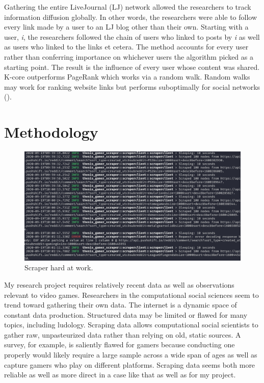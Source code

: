 \documentclass[12pt, a4paper]{article}
\begin{document}
Gathering the entire LiveJournal (LJ) network allowed the researchers to track information diffusion globally. In other words, the researchers were able to follow every link made by a user to an LJ blog other than their own. Starting with a user, \textit{i}, the researchers followed the chain of users who linked to posts by \textit{i} as well as users who linked to the links et cetera. The method accounts for every user rather than conferring importance on whichever users the algorithm picked as a starting point. The result is the influence of every user whose content was shared. K-core outperforms PageRank which works via a random walk. Random walks may work for ranking website links but performs suboptimally for social networks (\cite{peispread2014}).

\section{Methodology}

\begin{figure}[ht!]
  \includegraphics[width=\linewidth]{scraper_at_work.png}
  \caption{Scraper hard at work.}
  \label{fig:workingscraper}
\end{figure}

My research project requires relatively recent data as well as observations relevant to video games. Researchers in the computational social sciences seem to trend toward gathering their own data. The internet is a dynamic space of constant data production. Structured data may be limited or flawed for many topics, including ludology. Scraping data allows computational social scientists to gather raw, unpasteurized data rather than relying on old, static sources. A survey, for example, is saliently flawed for gamers because conducting one properly would likely require a large sample across a wide span of ages as well as capture gamers who play on different platforms. Scraping data seems both more reliable as well as more direct in a case like that as well as for my project.
\end{document}
